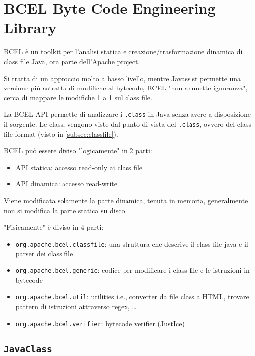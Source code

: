 \section{BCEL Byte Code Engineering Library}

BCEL è un toolkit per l'analisi statica e creazione/trasformazione dinamica di class file Java, ora parte dell'Apache project.

Si tratta di un approccio molto a basso livello, mentre Javassist permette una versione più astratta di modifiche al bytecode, BCEL "non ammette ignoranza", cerca di mappare le modifiche 1 a 1 sul class file.

La BCEL API permette di analizzare i \texttt{.class} in Java senza avere a disposizione il sorgente. Le classi vengono viste dal punto di vista del \texttt{.class}, ovvero del class file format (visto in \ref{subsec:classfile}).

BCEL può essere diviso "logicamente" in 2 parti:
\begin{itemize}
    \item API statica: accesso read-only ai class file

    \item API dinamica: accesso read-write
\end{itemize}
Viene modificata solamente la parte dinamica, tenuta in memoria, generalmente non si modifica la parte statica su disco.

"Fisicamente" è diviso in 4 parti:
\begin{itemize}
    \item \texttt{org.apache.bcel.classfile}: una struttura che descrive il class file java e il parser dei class file

    \item \texttt{org.apache.bcel.generic}: codice per modificare i class file e le istruzioni in bytecode

    \item \texttt{org.apache.bcel.util}: utilities i.e., converter da file class a HTML, trovare pattern di istruzioni attraverso regex, \dots

    \item \texttt{org.apache.bcel.verifier}: bytecode verifier (JustIce)
\end{itemize}

\subsection{\texttt{JavaClass}}

